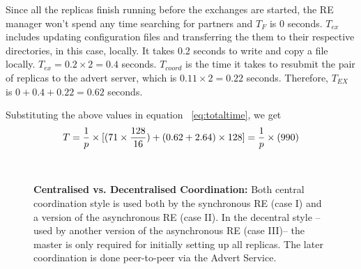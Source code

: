 \documentclass{rspublic}
\newcommand{\alnote}[1]{ {\textcolor{blue} { ***andre: #1 }}}
\newcommand{\alnote}[1]{}
\begin{document}
Since all the replicas finish running before
the exchanges are started, the RE manager won't spend any time
searching for partners and $T_F$ is 0 seconds. $T_{ex}$ includes
updating configuration files and transferring the them to their
respective directories, in this case, locally. It takes 0.2 seconds to
write and copy a file locally. $T_{ex} = 0.2 \times 2=0.4$
seconds. $T_{coord}$ is the time it takes to resubmit the pair of
replicas to the advert server, which is $0.11\times 2 = 0.22$
seconds. Therefore, $T_{EX}$ is $0+0.4+0.22=0.62$ seconds.

Substituting the above values in equation
~\ref{eq:totaltime}, we get
\begin{eqnarray}
T=  {1 \over p} \times {[ {(71\times {128\over 16}})+ (0.62 + 2.64)\times 128]} = {1 \over p} \times (990)
\label{eq:sync}
\end{eqnarray}


\begin{figure}%
\centering
{}\qquad
{}\\
\caption{\textbf{Centralised vs. Decentralised Coordination:} Both
  central coordination style is used both by the synchronous RE (case
  I) and a version of the asynchronous RE (case II).  In the decentral
  style -- used by another version of the asynchronous RE (case III)--
  the master is only required for initially setting up all
  replicas. The later coordination is done peer-to-peer via the Advert
  Service.}
\label{fig:coordination}
\end{figure}
\end{document}
